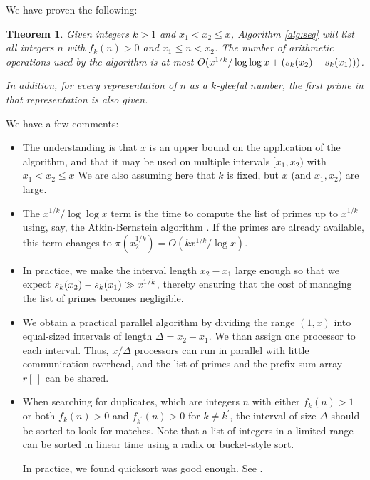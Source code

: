 \documentclass[11pt]{amsart}
\newtheorem{thm}{Theorem}[section]
\numberwithin{equation}{section}
\numberwithin{algorithm}{section}
\begin{document}
We have proven the following:
\begin{thm}
    Given integers $k>1$ and $x_1<x_2\le x$,
    Algorithm \ref{alg:seq} will list all integers $n$
    with $f_k(n)>0$ and $x_1\le n < x_2$.
    The number of arithmetic operations used by the algorithm
    is at most
    $O( x^{1/k}/\log\log x+({s_k}(x_2)-{s_k}(x_1)))$.

    In addition, for every representation of $n$ as a 
    $k$-gleeful number, the first prime in that representation
    is also given.
\end{thm}
We have a few comments:
\begin{itemize}
    
\item
The understanding is that $x$ is an upper bound on the application
of the algorithm, and that it may be used on multiple intervals
$[x_1,x_2)$ with $x_1<x_2\le x$
We are also assuming here that $k$ is fixed, but $x$ (and $x_1,x_2$)
are large.

\item
The $x^{1/k}/\log\log x$ term is the time to compute
the list of primes up to $x^{1/k}$ using, say,
the Atkin-Bernstein algorithm \cite{AB2004}.
If the primes are already available, this term changes to
$\pi(x_2^{1/k})=O(kx^{1/k}/\log x)$.

\item 
In practice, we make the interval length $x_2-x_1$
large enough so that we expect ${s_k}(x_2)-{s_k}(x_1)\gg x^{1/k}$,
thereby ensuring that the cost of
managing the list of primes becomes negligible.

\item 
We obtain a
practical parallel algorithm by dividing the range $(1,x)$
into equal-sized intervals of length $\Delta=x_2-x_1$.
We than assign one processor to each interval.
Thus, $x/\Delta$ processors can run in parallel with little
communication overhead, and the list of primes and the prefix sum
array $r[\,]$ can be shared.
\item 
When searching for duplicates, which are integers $n$ with either
  $f_k(n)>1$ or both $f_k(n)>0$ and $f_{k^\prime}(n)>0$ for $k\ne k^\prime$,
  the interval of size $\Delta$ should be sorted to look for matches.
  Note that a list of integers in a limited range can be sorted
  in linear time using a radix or bucket-style sort.

  In practice, we found quicksort \cite{Hoare62} was good enough.
  See \cite[\S5.2.5]{Knuthv3}.
\end{itemize}
\end{document}
